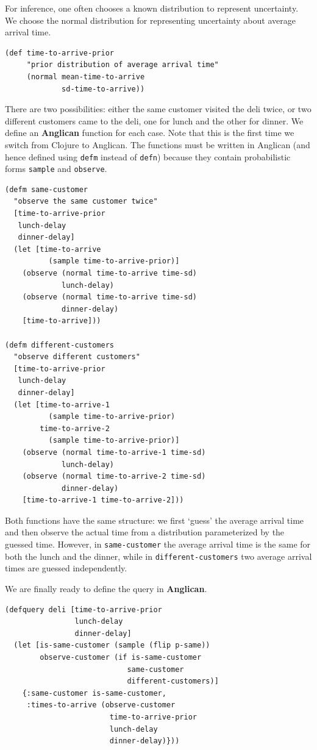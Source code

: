 \documentclass[preprint]{sigplanconf}
\begin{document}
For inference, one often chooses a known distribution to
represent uncertainty. We choose the normal
distribution for representing uncertainty about average arrival
time.

\begin{lstlisting}[style=default]
(def time-to-arrive-prior 
     "prior distribution of average arrival time"
     (normal mean-time-to-arrive
             sd-time-to-arrive))
\end{lstlisting}

There are two possibilities: either the same customer visited
the deli twice, or two different customers came to the deli,
one for lunch and the other for dinner. We define an \textbf{Anglican} function
for each case. Note that this is the first time we switch from
Clojure to Anglican. The functions must be written in Anglican
(and hence defined using \texttt{defm} instead of \texttt{defn})
because they contain probabilistic forms \texttt{sample} and
\texttt{observe}.

\begin{lstlisting}[style=default]
(defm same-customer 
  "observe the same customer twice"
  [time-to-arrive-prior
   lunch-delay
   dinner-delay]
  (let [time-to-arrive
          (sample time-to-arrive-prior)]
    (observe (normal time-to-arrive time-sd) 
             lunch-delay)
    (observe (normal time-to-arrive time-sd)
             dinner-delay)
    [time-to-arrive]))

(defm different-customers
  "observe different customers"
  [time-to-arrive-prior
   lunch-delay
   dinner-delay]
  (let [time-to-arrive-1
          (sample time-to-arrive-prior)
        time-to-arrive-2
          (sample time-to-arrive-prior)]
    (observe (normal time-to-arrive-1 time-sd) 
             lunch-delay)
    (observe (normal time-to-arrive-2 time-sd)
             dinner-delay)
    [time-to-arrive-1 time-to-arrive-2]))
\end{lstlisting}

Both functions have the same structure: we first `guess' the
average arrival time and then observe the actual time from a
distribution parameterized by the guessed time. However, in
\texttt{same-customer} the average arrival time is the same for
both the lunch and the dinner, while in
\texttt{different-customers} two average arrival times are
guessed independently.

We are finally ready to define the query in \textbf{Anglican}.

\begin{lstlisting}[style=default]
(defquery deli [time-to-arrive-prior
                lunch-delay
                dinner-delay]
  (let [is-same-customer (sample (flip p-same))
        observe-customer (if is-same-customer
                            same-customer
                            different-customers)]
    {:same-customer is-same-customer,
     :times-to-arrive (observe-customer 
                        time-to-arrive-prior
                        lunch-delay
                        dinner-delay)}))
\end{lstlisting}
\end{document}
